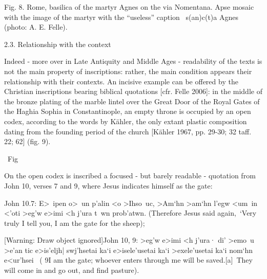 \documentclass[amsthm,ebook]{saparticle}
\begin{document}
Fig. 8. Rome, basilica of the martyr Agnes on the via Nomentana. Apse mosaic with the image of the martyr with the
“useless” caption \ s(an)c(t)a Agnes (photo: A. E. Felle).


\bigskip


\bigskip


\bigskip


\bigskip

2.3. Relationship with the context

Indeed - more over in Late Antiquity and Middle Ages - readability of the texts is not the main property of
inscriptions: rather, the main condition appears their relationship with their contexts. An incisive example can be
offered by the Christian inscriptions bearing biblical quotations [cfr. Felle 2006]: in the middle of the bronze
plating of the marble lintel over the Great Door of the Royal Gates of the Haghia Sophia in Constantinople, an empty
throne is occupied by an open codex, according to the words by Kähler, {\textquotedbl}the only extant plastic
composition dating from the founding period of the church{\textquotedbl} [Kähler 1967, pp. 29-30; 32 taff. 22; 62]
(fig. 9).

\ Fig


\bigskip

On the open codex is inscribed a focused - but barely readable - quotation from John 10, verses 7 and 9, where Jesus
indicates himself as the gate: 


\bigskip

John 10.7: \textgreek{E>~ipen} \textgreek{o>~un p'alin <o >Ihso~uc, >Am`hn >am`hn l'egw <um~in <'oti }\textgreek{>eg'w
e>imi <h j'ura t~wn prob'atwn}. (Therefore Jesus said again,~‘Very truly I tell you, I am the gate for the sheep); 

[Warning: Draw object ignored]John 10, 9: \textgreek{>eg'w e>imi <h j'ura· }\textgreek{di' >emo~u >e'an tic e>is'eljh|}
\textgreek{swj'hsetai ka`i }\textgreek{e>isele'usetai ka`i >exele'usetai ka`i nom`hn e<ur'hsei} \ ( 9I am the gate;
whoever enters through me will be saved.[a]~They will come in and go out, and find pasture).
\end{document}
